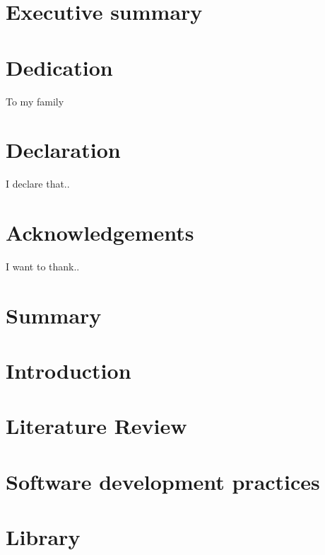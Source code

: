 \documentclass[12pt]{report}
\begin{document}
\thispagestyle{empty}



\thispagestyle{empty}
\chapter*{Executive summary}


\thispagestyle{empty}
\chapter*{Dedication}
To my family
\thispagestyle{empty}
\chapter*{Declaration}
I declare that..
\thispagestyle{empty}
\chapter*{Acknowledgements}
I want to thank..

\newpage
\thispagestyle{empty}
\tableofcontents

\newpage
\thispagestyle{empty}
\listoftables

\newpage
\thispagestyle{empty}
\listoffigures
 
\newpage
{}

\chapter*{Summary}


\chapter{Introduction}


\chapter{Literature Review}


\chapter{Software development practices}


\chapter{Library}

\end{document}
